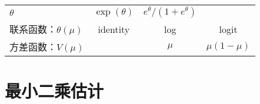 \documentclass[12pt,a4paper,UTF8,twoside]{book}
\theoremstyle{definition}
\theoremstyle{definition}
\theoremstyle{definition}
\theoremstyle{remark}
\begin{document}
\begin{longtable}[]{@{}lccc@{}}
\begin{minipage}[t]{0.22\columnwidth}
\(\theta\)\strut
\end{minipage} & \begin{minipage}[t]{0.22\columnwidth}\centering
\(\exp(\theta)\)\strut
\end{minipage} & \begin{minipage}[t]{0.22\columnwidth}\centering
\(e^{\theta}/(1+e^{\theta})\)\strut
\end{minipage}\tabularnewline
\begin{minipage}[t]{0.21\columnwidth}\raggedright
联系函数：\(\theta(\mu)\)\strut
\end{minipage} & \begin{minipage}[t]{0.22\columnwidth}\centering
identity\strut
\end{minipage} & \begin{minipage}[t]{0.22\columnwidth}\centering
log\strut
\end{minipage} & \begin{minipage}[t]{0.22\columnwidth}\centering
logit\strut
\end{minipage}\tabularnewline
\begin{minipage}[t]{0.21\columnwidth}\raggedright
方差函数：\(V(\mu)\)\strut
\end{minipage} & \begin{minipage}[t]{0.22\columnwidth}\centering
1\strut
\end{minipage} & \begin{minipage}[t]{0.22\columnwidth}\centering
\(\mu\)\strut
\end{minipage} & \begin{minipage}[t]{0.22\columnwidth}\centering
\(\mu(1-\mu)\)\strut
\end{minipage}\tabularnewline
\bottomrule
\end{longtable}

\hypertarget{sec:lse}{%
\section{最小二乘估计}\label{sec:lse}}
\end{document}
